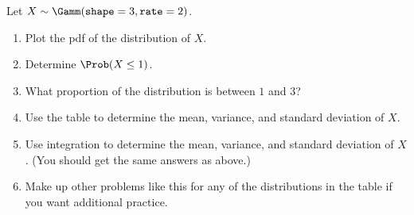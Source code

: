 \documentclass[twoside]{book}\usepackage[]{graphicx}\usepackage[]{xcolor}
\begin{document}
\begin{problem}
	Let $X \sim \Gamm(\texttt{shape} = 3, \texttt{rate} = 2) $.
	\begin{enumerate}
		\item
			Plot the pdf of the distribution of $X$.
		\item
			Determine $\Prob(X \le 1)$.
		\item
			What proportion of the distribution is between $1$ and $3$?
		\item
			Use the table to determine the mean, variance, and standard deviation
			of $X$.
		\item
			Use integration to determine the mean, variance, and standard deviation
			of $X$.  (You should get the same answers as above.)
		\item
			Make up other problems like this for any of the distributions
			in the table if you want additional practice.
	\end{enumerate}
\end{problem}
\end{document}

